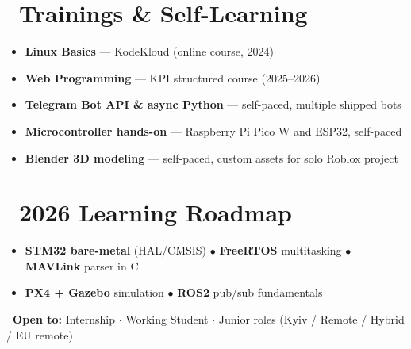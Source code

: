 \documentclass[10pt,a4paper,sans]{moderncv}
\begin{document}
\section{\faCertificate\ Trainings \& Self-Learning}
\begin{itemize}
    \item[\faBookmark] \small \textbf{Linux Basics} --- KodeKloud (online course, 2024)
    \item[\faBookmark] \small \textbf{Web Programming} --- KPI structured course (2025--2026)
    \item[\faBookmark] \small \textbf{Telegram Bot API \& async Python} --- self-paced, multiple shipped bots
    \item[\faBookmark] \small \textbf{Microcontroller hands-on} --- Raspberry Pi Pico W and ESP32, self-paced
    \item[\faBookmark] \small \textbf{Blender 3D modeling} --- self-paced, custom assets for solo Roblox project
\end{itemize}

\section{\faRoad\ 2026 Learning Roadmap}
\begin{itemize}
    \item[\faChevronRight] \small \textbf{STM32 bare-metal} (HAL/CMSIS) $\bullet$ \textbf{FreeRTOS} multitasking $\bullet$ \textbf{MAVLink} parser in C
    \item[\faChevronRight] \small \textbf{PX4 + Gazebo} simulation $\bullet$ \textbf{ROS2} pub/sub fundamentals
\end{itemize}

\vspace{0.3em}
\small\textbf{\faPaperPlane\ Open to:} Internship $\cdot$ Working Student $\cdot$ Junior roles \quad (Kyiv / Remote / Hybrid / EU remote)
\end{document}
